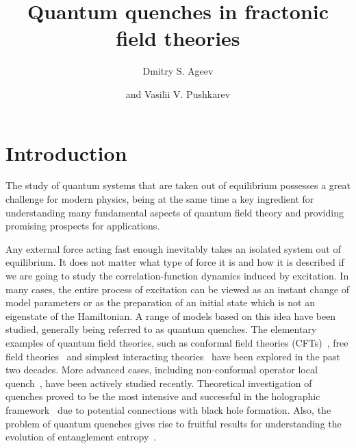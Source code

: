 \documentclass[a4paper,12pt]{article}
\title{Quantum quenches in fractonic field theories}
\author{Dmitry S. Ageev}
\author{and Vasilii V. Pushkarev}
\affiliation{Steklov Mathematical Institute, Russian Academy of Sciences,\\
Gubkin str. 8, 119991 Moscow, Russian Federation}
\begin{document}
 
\maketitle
\flushbottom

\section{Introduction}

The study of quantum systems that are taken out of equilibrium possesses a great challenge for modern physics, being at the same time a key ingredient for understanding many fundamental aspects of quantum field theory and providing promising prospects for applications.

Any external force acting fast enough inevitably takes an isolated system out of equilibrium. It does not matter what type of force it is and how it is described if we are going to study the correlation-function dynamics induced by excitation. In many cases, the entire process of excitation can be viewed as an instant change of model parameters or as the preparation of an initial state which is not an eigenstate of the Hamiltonian. A range of models based on this idea have been studied, generally being referred to as quantum quenches. The elementary examples of quantum field theories, such as conformal field theories (CFTs)~\cite{Calabrese:2006rx, Calabrese:2007rg, Das:2014hqa, Calabrese:2016xau}, free field theories~\cite{Sotiriadis2009thermal, Rajabpour:2014osa, Das:2015jka, Das:2016lla} and simplest interacting theories~\cite{Sotiriadis:2010si} have been explored in the past two decades. More advanced cases, including non-conformal operator local quench~\cite{He:2019vzf, Ageev:2022kpm}, have been actively studied recently. Theoretical investigation of quenches proved to be the most intensive and successful in the holographic framework~\cite{Danielsson:1999fa, Balasubramanian:2010ce, Balasubramanian:2011ur, Buchel:2013gba, Asplund:2014coa, Ageev:2017oku, Ageev:2017wet} due to potential connections with black hole formation. Also, the problem of quantum quenches gives rise to fruitful results for understanding the evolution of entanglement entropy~\cite{Calabrese:2005in, Nozaki:2014hna, He:2014mwa, Caputa:2014eta, Cotler:2016acd, Mozaffar:2021nex}.
\end{document}
